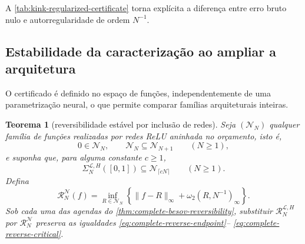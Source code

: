 \documentclass[11pt,a4paper]{article}
\newtheorem{theorem}{Teorema}[section]
\theoremstyle{definition}
\theoremstyle{remark}
\newcommand{\Library}{\mathcal{L}}
\begin{document}
A \cref{tab:kink-regularized-certificate} torna explícita a diferença entre
erro bruto nulo e autorregularidade de ordem $N^{-1}$.

\subsection{Estabilidade da caracterização ao ampliar a arquitetura}

O certificado é definido no espaço de funções, independentemente de uma
parametrização neural, o que permite comparar famílias arquiteturais inteiras.

\begin{theorem}[reversibilidade estável por inclusão de redes]
\label{thm:architecture-stable-reversibility}
Seja $(\mathcal N_N)$ qualquer família de funções realizadas por redes ReLU
aninhada no orçamento, isto é,
\begin{equation}
 0\in\mathcal N_N,
 \qquad \mathcal N_N\subseteq\mathcal N_{N+1}
 \qquad(N\ge1),
 \label{eq:network-family-nesting}
\end{equation}
e suponha que, para alguma constante $c\ge1$,
\begin{equation}
 \Sigma_N^{\Library,H}([0,1])\subseteq\mathcal N_{\lceil cN\rceil}
 \qquad(N\ge1).
 \label{eq:network-family-contains-library}
\end{equation}
Defina
\begin{equation}
 \mathcal R_N^{\mathcal N}(f)
 =\inf_{R\in\mathcal N_N}
 \left\{\|f-R\|_\infty+\omega_2(R,N^{-1})_\infty\right\}.
 \label{eq:network-regularized-certificate}
\end{equation}
Sob cada uma das agendas do
\cref{thm:complete-besov-reversibility}, substituir
$\mathcal R_N^{\Library,H}$ por $\mathcal R_N^{\mathcal N}$ preserva as
igualdades \eqref{eq:complete-reverse-endpoint}--
\eqref{eq:complete-reverse-critical}.
\end{theorem}
\end{document}
